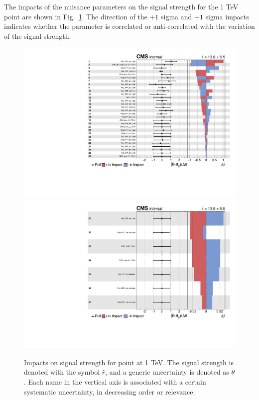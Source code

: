 The impacts of the nuisance parameters on the signal strength for the 1 TeV point are shown in Fig.~\ref{impacts}. The direction of the $+1$ sigma and $-1$ sigma impacts indicates whether the parameter is correlated or anti-correlated with the variation of the signal strength.

\begin{figure}[h]
\centering
\includegraphics[scale=0.65]{figures/limits/impacts_1000_ANP_1.pdf}\\
\includegraphics[scale=0.65]{figures/limits/impacts_1000_ANP_2.pdf}
\caption[Nuisance parameters]{Impacts on signal strength for point at 1 TeV. The signal strength is denoted with the symbol $\hat{r}$, and a generic uncertainty is denoted as $\theta$. Each name in the vertical axis is associated with a certain systematic uncertainty, in decreasing order or relevance.}
\label{impacts}
\end{figure}
